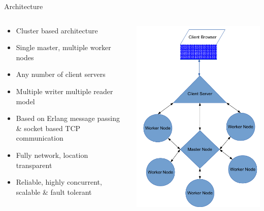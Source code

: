 \documentclass{beamer}
\begin{document}
\begin{frame}{Architecture}
\begin{columns}[onlytextwidth]
  \begin{column}{0.6\textwidth}
      \begin{itemize}
      \item Cluster based architecture
      \item Single master, multiple worker nodes
      \item Any number of client servers
      \item Multiple writer multiple reader model
      \item Based on Erlang message passing \& socket based TCP communication
      \item Fully network, location transparent
      \item Reliable, highly concurrent, scalable \& fault tolerant
      \end{itemize}
  \end{column}
  \begin{column}{0.4\textwidth}
      \includegraphics[scale=0.3]{images/design}
  \end{column}
\end{columns}
\end{frame}
\end{document}
